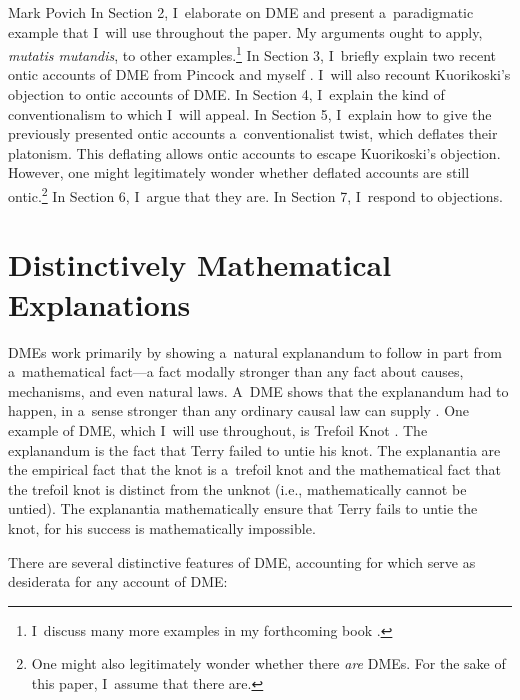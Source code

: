 \begin{artengenv}{Mark Povich}
In Section 2, I~elaborate on DME and present a~paradigmatic example that I~will use throughout the paper. My arguments ought to apply, \textit{mutatis mutandis}, to other examples.\footnote{I~discuss many more examples in my forthcoming book
\parencite[][]{povich_rules_2024}.%
} In Section 3, I~briefly explain two recent ontic accounts of DME from Pincock 
\parencite*[][]{pincock_abstract_2015} %
 and myself 
\parencite[][]{povich_narrow_2021}. %
 I~will also recount Kuorikoski's 
\parencite*[][]{kuorikoski_there_2021} %
 objection to ontic accounts of DME. In Section 4, I~explain the kind of conventionalism to which I~will appeal. In Section 5, I~explain how to give the previously presented ontic accounts a~conventionalist twist, which deflates their platonism. This deflating allows ontic accounts to escape Kuorikoski's objection. However, one might legitimately wonder whether deflated accounts are still ontic.\footnote{One might also legitimately wonder whether there \textit{are} DMEs. For the sake of this paper, I~assume that there are.} In Section 6, I~argue that they are. In Section 7, I~respond to objections.

\section{Distinctively Mathematical Explanations}
DMEs work primarily by showing a~natural explanandum to follow in part from a~mathematical fact---a fact modally stronger than any fact about causes, mechanisms, and even natural laws. A~DME shows that the explanandum had to happen, in a~sense stronger than any ordinary causal law can supply
\parencite[][]{lange_what_2013}. %
 One example of DME, which I~will use throughout, is Trefoil Knot 
\parencite[][]{lange_what_2013}. %
 The explanandum is the fact that Terry failed to untie his knot. The explanantia are the empirical fact that the knot is a~trefoil knot and the mathematical fact that the trefoil knot is distinct from the unknot (i.e., mathematically cannot be untied). The explanantia mathematically ensure that Terry fails to untie the knot, for his success is mathematically impossible.

There are several distinctive features of DME, accounting for which serve as desiderata for any account of DME:


\end{artengenv}
